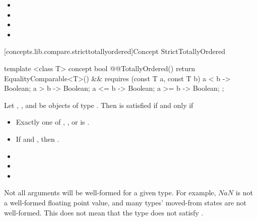 \begin{addedblock}
\begin{itemdescr}
\begin{itemize}
\item {}
\item {}
\item {}
\item {}
\end{itemize}
\end{itemdescr}

[concepts.lib.compare.stricttotallyordered]{Concept StrictTotallyOrdered}


%
\begin{itemdecl}
template <class T>
concept bool @@TotallyOrdered() {
  return EqualityComparable<T>() &&
    requires (const T a, const T b) {
      { a < b } -> Boolean;
      { a > b } -> Boolean;
      { a <= b } -> Boolean;
      { a >= b } -> Boolean;
    };
}
\end{itemdecl}

\begin{itemdescr}
\pnum
Let , , and  be objects of type .
Then  is satisfied if and only if

\begin{itemize}
\item Exactly one of , , or
       is .
\item If  and , then
      .
\item {}
\item {}
\item {}
\end{itemize}

{\color{oldclr}
\pnum
\enternote Not all arguments will be well-formed for a given type. For example, $NaN$ is not a
well-formed floating point value, and many types' moved-from states are not well-formed. This
does not mean that the type does not satisfy .\exitnote
}
\end{itemdescr}


\end{addedblock}
